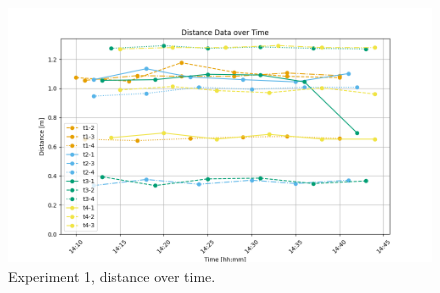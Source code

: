 \begin{figure}[ht!]
	\includegraphics[width=\linewidth]{graphics/exp/exp1_dist_data_plot_0.png}
	\caption{Experiment 1, distance over time.}
	\label{f:exp1_graphs_dist}
\end{figure}

